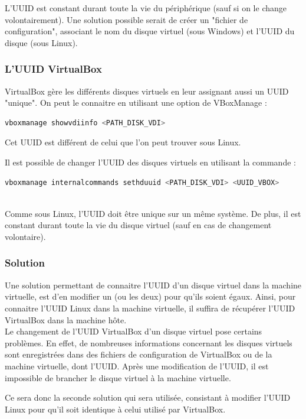 L'UUID est constant durant toute la vie du périphérique (sauf si on le change volontairement).
Une solution possible serait de créer un "fichier de configuration", associant le nom du disque virtuel (sous Windows) et l'UUID du disque (sous Linux).
\\




\subsubsection{L'UUID VirtualBox}

VirtualBox gère les différents disques virtuels en leur assignant aussi un UUID "unique".
On peut le connaitre en utilisant une option de VBoxManage :
\begin{lstlisting}[language = sh]
vboxmanage showvdiinfo <PATH_DISK_VDI>
\end{lstlisting}
Cet UUID est différent de celui que l'on peut trouver sous Linux.

Il est possible de changer l'UUID des disques virtuels en utilisant la commande :
\begin{lstlisting}[language = sh]
vboxmanage internalcommands sethduuid <PATH_DISK_VDI> <UUID_VBOX>
\end{lstlisting}
~~\\


Comme sous Linux, l'UUID doit être unique sur un même système.
De plus, il est constant durant toute la vie du disque virtuel (sauf en cas de changement volontaire).
\\




\subsubsection{Solution}

Une solution permettant de connaitre l'UUID d'un disque virtuel dans la machine virtuelle, est d'en modifier un (ou les deux) pour qu'ils soient égaux.
Ainsi, pour connaitre l'UUID Linux dans la machine virtuelle, il suffira de récupérer l'UUID VirtualBox dans la machine hôte.
\\


Le changement de l'UUID VirtualBox d'un disque virtuel pose certains problèmes.
En effet, de nombreuses informations concernant les disques virtuels sont enregistrées dans des fichiers de configuration de VirtualBox ou de la machine virtuelle, dont l'UUID.
Après une modification de l'UUID, il est impossible de brancher le disque virtuel à la machine virtuelle.

Ce sera donc la seconde solution qui sera utilisée, consistant à modifier l'UUID Linux pour qu'il soit identique à celui utilisé par VirtualBox.
\\



